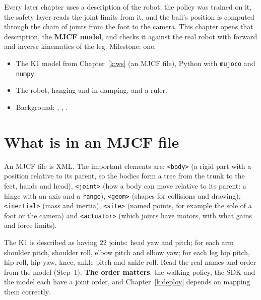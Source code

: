 \label{k:model}

Every later chapter uses a description of the robot: the policy was trained on it, the safety layer reads the joint limits from it, and the ball's position is computed through the chain of joints from the foot to the camera. This chapter opens that description, the \textbf{MJCF model}, and checks it against the real robot with forward and inverse kinematics of the leg. Milestone: one.

\begin{needbox}
\begin{itemize}[nosep]
  \item The K1 model from Chapter~\ref{k:ws} (an MJCF file), Python with \texttt{mujoco} and \texttt{numpy}.
  \item The robot, hanging and in damping, and a ruler.
  \item Background: , , .
\end{itemize}
\end{needbox}

\section*{What is in an MJCF file}
An MJCF file is XML. The important elements are: \texttt{<body>} (a rigid part with a position relative to its parent, so the bodies form a tree from the trunk to the feet, hands and head), \texttt{<joint>} (how a body can move relative to its parent: a hinge with an axis and a \texttt{range}), \texttt{<geom>} (shapes for collisions and drawing), \texttt{<inertial>} (mass and inertia), \texttt{<site>} (named points, for example the sole of a foot or the camera) and \texttt{<actuator>} (which joints have motors, with what gains and force limits).

\begin{guessbox}
The K1 is described as having $22$ joints: head yaw and pitch; for each arm shoulder pitch, shoulder roll, elbow pitch and elbow yaw; for each leg hip pitch, hip roll, hip yaw, knee, ankle pitch and ankle roll\guess. Read the real names and order from the model (Step~1). \textbf{The order matters}: the walking policy, the SDK and the model each have a joint order, and Chapter~\ref{k:deploy} depends on mapping them correctly.
\end{guessbox}

